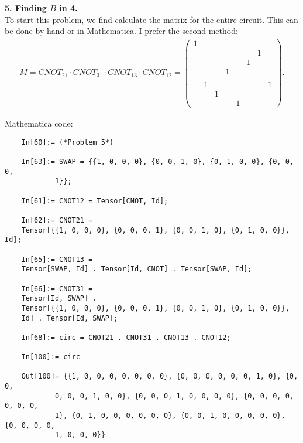 \documentclass{article}
\theoremstyle{definition}
\begin{document}
\noindent \textbf{5. Finding $B$ in 4.}\\

\noindent To start this problem, we find calculate the matrix for the entire circuit. This can be done by hand or in Mathematica. I prefer the second method:
\begin{align*}
	M = CNOT_{21} \cdot CNOT_{31} \cdot CNOT_{13} \cdot CNOT_{12} = 
	\begin{pmatrix}
		1& & & && & & \\
		 & & & && &1& \\
		 & & & &&1& & \\
		 & & &1&& & & \\
		 & & & && & & \\
		 &1& & && & &1\\
		 & &1& && & & \\
		 & & & &1&& &
	\end{pmatrix}.
\end{align*}




Mathematica code:
\begin{lstlisting}
	In[60]:= (*Problem 5*)
	
	In[63]:= SWAP = {{1, 0, 0, 0}, {0, 0, 1, 0}, {0, 1, 0, 0}, {0, 0, 0, 
			1}};
	
	In[61]:= CNOT12 = Tensor[CNOT, Id];
	
	In[62]:= CNOT21 = 
	Tensor[{{1, 0, 0, 0}, {0, 0, 0, 1}, {0, 0, 1, 0}, {0, 1, 0, 0}}, Id];
	
	In[65]:= CNOT13 = 
	Tensor[SWAP, Id] . Tensor[Id, CNOT] . Tensor[SWAP, Id];
	
	In[66]:= CNOT31 = 
	Tensor[Id, SWAP] . 
	Tensor[{{1, 0, 0, 0}, {0, 0, 0, 1}, {0, 0, 1, 0}, {0, 1, 0, 0}}, 
	Id] . Tensor[Id, SWAP];
	
	In[68]:= circ = CNOT21 . CNOT31 . CNOT13 . CNOT12;
	
	In[100]:= circ
	
	Out[100]= {{1, 0, 0, 0, 0, 0, 0, 0}, {0, 0, 0, 0, 0, 0, 1, 0}, {0, 0, 
			0, 0, 0, 1, 0, 0}, {0, 0, 0, 1, 0, 0, 0, 0}, {0, 0, 0, 0, 0, 0, 0, 
			1}, {0, 1, 0, 0, 0, 0, 0, 0}, {0, 0, 1, 0, 0, 0, 0, 0}, {0, 0, 0, 0,
			1, 0, 0, 0}}
\end{lstlisting}
\end{document}
